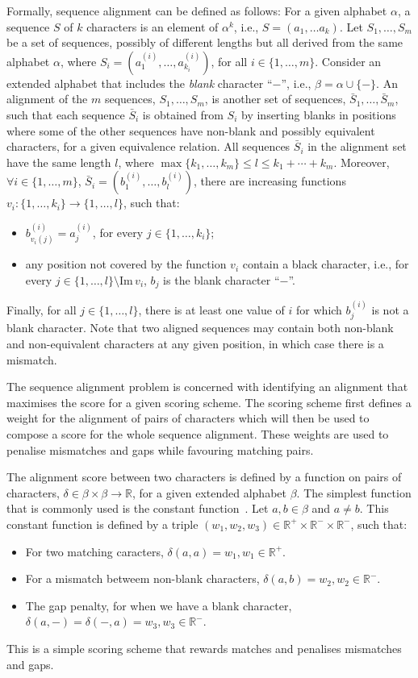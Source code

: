 Formally, sequence alignment can be defined as follows:
For a given alphabet $\alpha$, a sequence $S$ of $k$ characters is an element of
$\alpha^k$, i.e., $S = (a_1, \ldots a_k)$.
Let $S_1, \ldots, S_m$ be a set of sequences, possibly of different lengths but
all derived from the same alphabet $\alpha$, where
$S_i = (a_1^{(i)}, \ldots, a_{k_i}^{(i)})$, for all $i\in\{1,\ldots,m\}$.
Consider an extended alphabet that includes the \textit{blank} character ``$-$'',
i.e., $\beta = \alpha \cup \{-\}$.
An alignment of the $m$ sequences, $S_1, \ldots, S_m$, is another set of sequences,
$\bar{S}_1, \ldots, \bar{S}_m$, such that each sequence $\bar{S}_i$ is obtained
from $S_i$ by inserting blanks in positions where some of the other sequences
have non-blank and possibly equivalent characters, for a given equivalence relation.
All sequences $\bar{S}_i$ in the alignment set have the same length $l$, where
$\max\{k_1,\ldots,k_m\} \leq l \leq k_1 + \cdots + k_m$.
Moreover, $\forall i\in\{1,\ldots, m\}$, $\bar{S}_i = (b_1^{(i)},\ldots,b_l^{(i)})$,
there are increasing functions $v_i: \{1,\ldots,k_i\} \to \{1,\ldots,l\}$, such that:
\begin{itemize}
\item $b_{v_i(j)}^{(i)} = a_j^{(i)}$, for every $j \in \{1,\ldots,k_i\}$;
\item any position not covered by the function $v_i$ contain a black character, i.e., for every $j \in \{1,\ldots,l\}\setminus \textrm{Im} \, v_i$, $b_j$ is the blank character ``$-$''.
\end{itemize}
Finally, for all $j\in\{1,\ldots,l\}$, there is at least one value of $i$ for which $b_j^{(i)}$ is not a blank character.
Note that two aligned sequences may contain both non-blank and non-equivalent characters at any given position, in which case there is a mismatch.

The sequence alignment problem is concerned with identifying an alignment that maximises the score for a given scoring scheme.
The scoring scheme first defines a weight for the alignment of pairs of characters which will then be used to compose a score for the whole sequence alignment.
These weights are used to penalise mismatches and gaps while favouring matching pairs.

The alignment score between two characters is defined by a function on pairs of characters, $\delta \in \beta\times\beta \to \mathbb{R}$, for a given extended alphabet $\beta$.
The simplest function that is commonly used is the constant function~\cite{haque09}.
Let $a,b\in\beta$ and $a \neq b$.
This constant function is defined by a triple $(w_1,w_2,w_3)\in\mathbb{R}^+\times\mathbb{R}^-\times\mathbb{R}^-$, such that:
\begin{itemize}
\item For two matching caracters, $\delta(a,a) = w_1, w_1\in\mathbb{R}^+$.
\item For a mismatch betweem non-blank characters, $\delta(a,b) = w_2, w_2\in\mathbb{R}^-$.
\item The gap penalty, for when we have a blank character, $\delta(a,-) = \delta(-,a) = w_3, w_3\in\mathbb{R}^-$.
\end{itemize}
This is a simple scoring scheme that rewards matches and penalises mismatches and gaps.

